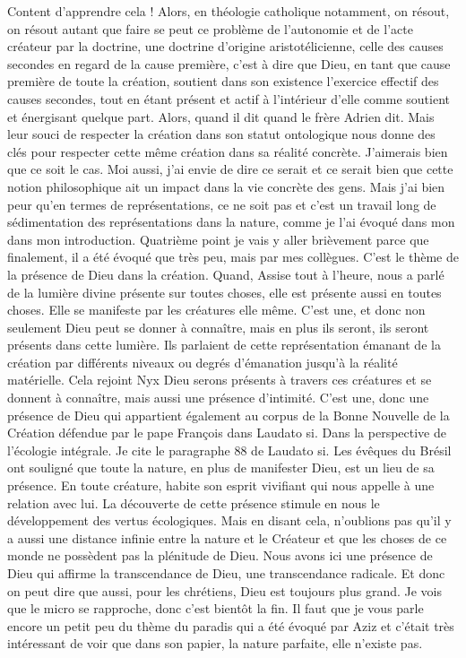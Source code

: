 Content d'apprendre cela ! Alors, en théologie catholique notamment, on résout, on résout autant que faire se peut ce problème de l'autonomie et de l'acte créateur par la doctrine, une doctrine d'origine aristotélicienne, celle des causes secondes en regard de la cause première, c'est à dire que Dieu, en tant que cause première de toute la création, soutient dans son existence l'exercice effectif des causes secondes, tout en étant présent et actif à l'intérieur d'elle comme soutient et énergisant quelque part.
Alors, quand il dit quand le frère Adrien dit. Mais leur souci de respecter la création dans son statut ontologique nous donne des clés pour respecter cette même création dans sa réalité concrète. J'aimerais bien que ce soit le cas. Moi aussi, j'ai envie de dire ce serait et ce serait bien que cette notion philosophique ait un impact dans la vie concrète des gens.
Mais j'ai bien peur qu'en termes de représentations, ce ne soit pas et c'est un travail long de sédimentation des représentations dans la nature, comme je l'ai évoqué dans mon dans mon introduction. Quatrième point je vais y aller brièvement parce que finalement, il a été évoqué que très peu, mais par mes collègues. C'est le thème de la présence de Dieu dans la création.
Quand, Assise tout à l'heure, nous a parlé de la lumière divine présente sur toutes choses, elle est présente aussi en toutes choses. Elle se manifeste par les créatures elle même. C'est une, et donc non seulement Dieu peut se donner à connaître, mais en plus ils seront, ils seront présents dans cette lumière. Ils parlaient de cette représentation émanant de la création par différents niveaux ou degrés d'émanation jusqu'à la réalité matérielle.
Cela rejoint Nyx Dieu serons présents à travers ces créatures et se donnent à connaître, mais aussi une présence d'intimité. C'est une, donc une présence de Dieu qui appartient également au corpus de la Bonne Nouvelle de la Création défendue par le pape François dans Laudato si. Dans la perspective de l'écologie intégrale. Je cite le paragraphe 88 de Laudato si.
Les évêques du Brésil ont souligné que toute la nature, en plus de manifester Dieu, est un lieu de sa présence. En toute créature, habite son esprit vivifiant qui nous appelle à une relation avec lui. La découverte de cette présence stimule en nous le développement des vertus écologiques. Mais en disant cela, n'oublions pas qu'il y a aussi une distance infinie entre la nature et le Créateur et que les choses de ce monde ne possèdent pas la plénitude de Dieu.
Nous avons ici une présence de Dieu qui affirme la transcendance de Dieu, une transcendance radicale. Et donc on peut dire que aussi, pour les chrétiens, Dieu est toujours plus grand. Je vois que le micro se rapproche, donc c'est bientôt la fin. Il faut que je vous parle encore un petit peu du thème du paradis qui a été évoqué par Aziz et c'était très intéressant de voir que dans son papier, la nature parfaite, elle n'existe pas.
